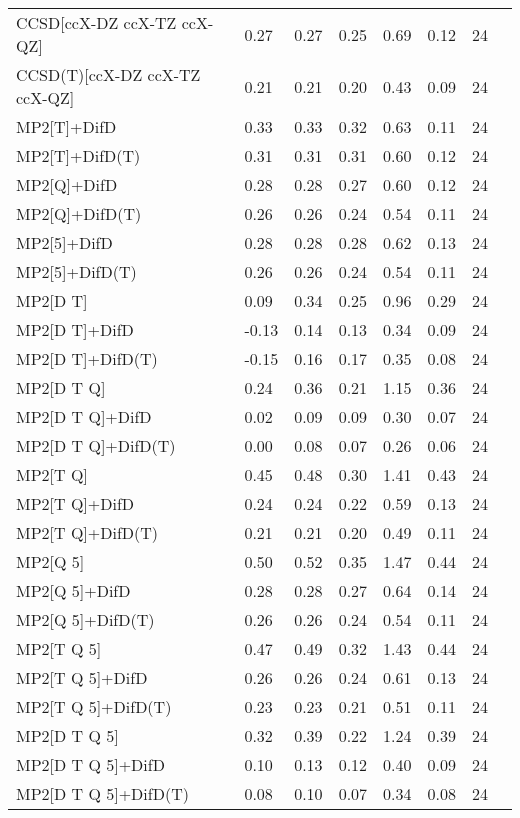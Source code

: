 \begin{table}
\begin{tabular}{l l l l l l l l }
    CCSD[ccX-DZ ccX-TZ ccX-QZ] & 0.27 & 0.27 & 0.25 & 0.69 & 0.12 & 24 \\ 
    CCSD(T)[ccX-DZ ccX-TZ ccX-QZ] & 0.21 & 0.21 & 0.20 & 0.43 & 0.09 & 24 \\ 
    MP2[T]+DifD & 0.33 & 0.33 & 0.32 & 0.63 & 0.11 & 24 \\ 
    MP2[T]+DifD(T) & 0.31 & 0.31 & 0.31 & 0.60 & 0.12 & 24 \\ 
    MP2[Q]+DifD & 0.28 & 0.28 & 0.27 & 0.60 & 0.12 & 24 \\ 
    MP2[Q]+DifD(T) & 0.26 & 0.26 & 0.24 & 0.54 & 0.11 & 24 \\ 
    MP2[5]+DifD & 0.28 & 0.28 & 0.28 & 0.62 & 0.13 & 24 \\ 
    MP2[5]+DifD(T) & 0.26 & 0.26 & 0.24 & 0.54 & 0.11 & 24 \\ 
    MP2[D T] & 0.09 & 0.34 & 0.25 & 0.96 & 0.29 & 24 \\ 
    MP2[D T]+DifD & -0.13 & 0.14 & 0.13 & 0.34 & 0.09 & 24 \\ 
    MP2[D T]+DifD(T) & -0.15 & 0.16 & 0.17 & 0.35 & 0.08 & 24 \\ 
    MP2[D T Q] & 0.24 & 0.36 & 0.21 & 1.15 & 0.36 & 24 \\ 
    MP2[D T Q]+DifD & 0.02 & 0.09 & 0.09 & 0.30 & 0.07 & 24 \\ 
    MP2[D T Q]+DifD(T) & 0.00 & 0.08 & 0.07 & 0.26 & 0.06 & 24 \\ 
    MP2[T Q] & 0.45 & 0.48 & 0.30 & 1.41 & 0.43 & 24 \\ 
    MP2[T Q]+DifD & 0.24 & 0.24 & 0.22 & 0.59 & 0.13 & 24 \\ 
    MP2[T Q]+DifD(T) & 0.21 & 0.21 & 0.20 & 0.49 & 0.11 & 24 \\ 
    MP2[Q 5] & 0.50 & 0.52 & 0.35 & 1.47 & 0.44 & 24 \\ 
    MP2[Q 5]+DifD & 0.28 & 0.28 & 0.27 & 0.64 & 0.14 & 24 \\ 
    MP2[Q 5]+DifD(T) & 0.26 & 0.26 & 0.24 & 0.54 & 0.11 & 24 \\ 
    MP2[T Q 5] & 0.47 & 0.49 & 0.32 & 1.43 & 0.44 & 24 \\ 
    MP2[T Q 5]+DifD & 0.26 & 0.26 & 0.24 & 0.61 & 0.13 & 24 \\ 
    MP2[T Q 5]+DifD(T) & 0.23 & 0.23 & 0.21 & 0.51 & 0.11 & 24 \\ 
    MP2[D T Q 5] & 0.32 & 0.39 & 0.22 & 1.24 & 0.39 & 24 \\ 
    MP2[D T Q 5]+DifD & 0.10 & 0.13 & 0.12 & 0.40 & 0.09 & 24 \\ 
    MP2[D T Q 5]+DifD(T) & 0.08 & 0.10 & 0.07 & 0.34 & 0.08 & 24 \\ 
    \bottomrule
  \end{tabular}
\end{table}
